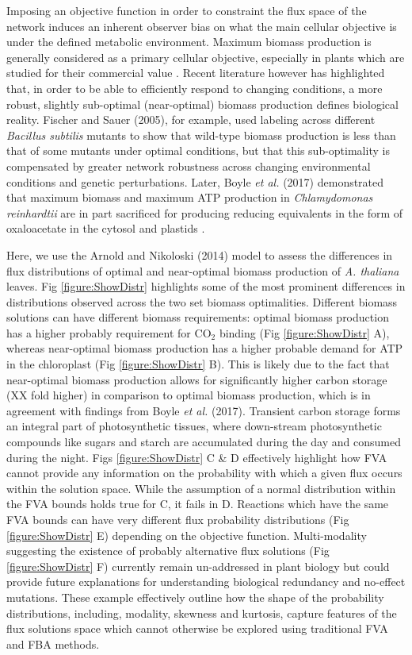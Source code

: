 \documentclass[10pt,letterpaper]{article}
\begin{document}
Imposing an objective function in order to constraint the flux space of the network induces an inherent observer bias on what the main cellular objective is under the defined metabolic environment. Maximum biomass production is generally considered as a primary cellular objective, especially in plants which are studied for their commercial value \cite{hay} \cite{schwender} \cite{grafahrend}. Recent literature however has highlighted that, in order to be able to efficiently respond to changing conditions, a more robust, slightly sub-optimal (near-optimal) biomass production defines biological reality\cite{schuetz}\cite{fischer}\cite{poolman}\cite{boyle}. Fischer and Sauer (2005), for example, used labeling across different \textit{Bacillus subtilis} mutants to show that wild-type biomass production is less than that of some mutants under optimal conditions, but that this sub-optimality is compensated by greater network robustness across changing environmental conditions and genetic perturbations. Later, Boyle \textit{et al.} (2017) demonstrated that maximum biomass and maximum ATP production in \textit{Chlamydomonas reinhardtii} are in part sacrificed for producing reducing equivalents in the form of oxaloacetate in the cytosol and plastids \cite{boyle}. 

Here, we use the Arnold and Nikoloski (2014) model to assess the differences in flux distributions of optimal and near-optimal biomass production of \textit{A. thaliana} leaves. Fig \ref{figure:ShowDistr} highlights some of the most prominent differences in distributions observed across the two set biomass optimalities. Different biomass solutions can have different biomass requirements: optimal biomass production has a higher probably requirement for CO$_2$ binding (Fig \ref{figure:ShowDistr} A), whereas near-optimal biomass production has a higher probable demand for ATP in the chloroplast (Fig \ref{figure:ShowDistr} B). This is likely due to the fact that near-optimal biomass production allows for significantly higher carbon storage (XX fold higher) in comparison to optimal biomass production, which is in agreement with findings from Boyle \textit{et al.} (2017). Transient carbon storage forms an integral part of photosynthetic tissues, where down-stream photosynthetic compounds like sugars and starch are accumulated during the day and consumed during the night. Figs \ref{figure:ShowDistr} C \& D effectively highlight how FVA cannot provide any information on the probability with which a given flux occurs within the solution space. While the assumption of a normal distribution within the FVA bounds holds true for C, it fails in D. Reactions which have the same FVA bounds can have very different flux probability distributions (Fig \ref{figure:ShowDistr} E) depending on the objective function. Multi-modality suggesting the existence of probably alternative flux solutions (Fig \ref{figure:ShowDistr} F) currently remain un-addressed in plant biology but could provide future explanations for understanding biological redundancy and no-effect mutations. These example effectively outline how the shape of the probability distributions, including, modality, skewness and kurtosis, capture features of the flux solutions space which cannot otherwise be explored using traditional FVA and FBA methods. 
\end{document}
